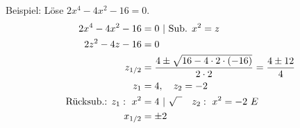 Beispiel: Löse \(2x^4-4x^2-16=0\).
{\large\textcolor{loes}{\begin{align*}
		2x^4-4x^2-16&=0\ \vert\ \text{Sub. }x^2=z\\
		2z^2-4z-16&=0\\
		z_{1/2}&=\frac{4\pm\sqrt{16-4\cdot 2\cdot \left( -16\right) }}{2\cdot 2}=\frac{4\pm 12}{4}\\
		z_1&=4,\quad z_2=-2\\
		\text{Rücksub.: }z_1:\ x^2&=4\ \vert\ \sqrt{\phantom{x}}\quad z_2:\ x^2=-2\ \Lightning\\
		x_{1/2}&=\pm2
\end{align*}}}
\newpage
\begin{Exercise}[title={Berechne die Nullstellen}, label=ganzNSTA1]


\end{Exercise}
